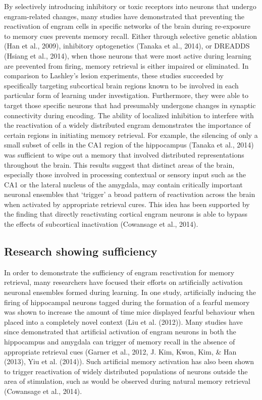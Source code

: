 \documentclass[12pt,a4paperpaper,]{report}
\begin{document}
By selectively introducing inhibitory or toxic receptors into neurons
that undergo engram-related changes, many studies have demonstrated that
preventing the reactivation of engram cells in specific networks of the
brain during re-exposure to memory cues prevents memory recall. Either
through selective genetic ablation (Han et al., 2009), inhibitory
optogenetics (Tanaka et al., 2014), or DREADDS (Hsiang et al., 2014),
when those neurons that were most active during learning are prevented
from firing, memory retrieval is either impaired or eliminated. In
comparison to Lashley's lesion experiments, these studies succeeded by
specifically targeting subcortical brain regions known to be involved in
each particular form of learning under investigation. Furthermore, they
were able to target those specific neurons that had presumably undergone
changes in synaptic connectivity during encoding. The ability of
localized inhibition to interfere with the reactivation of a widely
distributed engram demonstrates the importance of certain regions in
initiating memory retrieval. For example, the silencing of only a small
subset of cells in the CA1 region of the hippocampus (Tanaka et al.,
2014) was sufficient to wipe out a memory that involved distributed
representations throughout the brain. This results suggest that distinct
areas of the brain, especially those involved in processing contextual
or sensory input such as the CA1 or the lateral nucleus of the amygdala,
may contain critically important neuronal ensembles that `trigger' a
broad pattern of reactivation across the brain when activated by
appropriate retrieval cures. This idea has been supported by the finding
that directly reactivating cortical engram neurons is able to bypass the
effects of subcortical inactivation (Cowansage et al., 2014).

\subsection{Research showing
sufficiency}\label{research-showing-sufficiency}

In order to demonstrate the sufficiency of engram reactivation for
memory retrieval, many researchers have focused their efforts on
artificially activation neuronal ensembles formed during learning. In
one study, artificially inducing the firing of hippocampal neurons
tagged during the formation of a fearful memory was shown to increase
the amount of time mice displayed fearful behaviour when placed into a
completely novel context (Liu et al. (2012)). Many studies have since
demonstrated that artificial activation of engram neurons in both the
hippocampus and amygdala can trigger of memory recall in the absence of
appropriate retrieval cues (Garner et al., 2012, J. Kim, Kwon, Kim, \&
Han (2013), Yiu et al. (2014)). Such artificial memory activation has
also been shown to trigger reactivation of widely distributed
populations of neurons outside the area of stimulation, such as would be
observed during natural memory retrieval (Cowansage et al., 2014).
\end{document}
